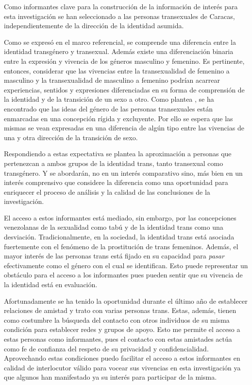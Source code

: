   Como informantes clave para la construcción de la
información de interés para esta investigación se han seleccionado a las
personas transexuales de Caracas, independientemente de la dirección de la
identidad asumida.

  Como se expresó en el marco referencial, se comprende una diferencia entre la
identidad transgénero y transexual. Además existe una diferenciación binaria
entre la expresión y vivencia de los géneros masculino y femenino. Es
pertinente, entonces, considerar que las vivencias entre la transexualidad de
femenino a masculino y la transexualidad de masculino a femenino podrían
acarrear experiencias, sentidos y expresiones diferenciadas en su forma de
comprensión de la identidad y de la transición de un sexo a otro. Como plantea
\textcite[][p. 218]{BergeroMiguel2008}, se ha encontrado que las ideas del
género de las
personas transexuales están enmarcadas en una concepción rígida y excluyente.
Por ello se espera que las mismas se vean expresadas en una diferencia de algún
tipo entre las vivencias de una y otra dirección de la transición de sexo.

  Respondiendo a estas expectativa se plantea la aproximación a personas que
pertenezcan a ambos grupos de la identidad trans, tanto transexual como
transgénero. Y se abordarán,
no en un interés comparativo sino, más bien en un interés comprensivo que
considere la diferencia como una oportunidad para enriquecer el proceso de
análisis y la calidad de las conclusiones de la investigación.

  El acceso a estos informantes está mediado, sin embargo, por las concepciones
venezolanas de la sexualidad como tabú y de la identidad trans como una
desviación. Tradicionalmente, en la sociedad, la identidad trans está asociada
fuertemente con el fenómeno de la prostitución de trans femeninos. Además, el
mayor  interés de las personas trans está fijado en su capacidad para
\emph{pasar} efectivamente como el género con el cual se identifican. Esto puede
representar un obstáculo para el acceso a los informantes pues pueden sentir que
su vivencia de la identidad está en evaluación.

  Afortunadamente se ha tenido la oportunidad durante el último año de establecer
relaciones de amistad y trato con varias personas trans. Estas, además, tienen
como costumbre la búsqueda del contacto con otros individuos de su misma
condición para establecer redes y grupos de apoyo. Esto me permite el acceso a
estas personas como informantes, pues el contacto con estas amistades actúa como
fe de confianza del respeto de su privacidad y confidencialidad. Aprovechando
estas condiciones puedo facilitar el acceso a estos informantes en calidad de
interlocutor válido para vocear sus vivencias en esta investigación ya que
algunos han manifestado ya su interés para participar de la misma.

